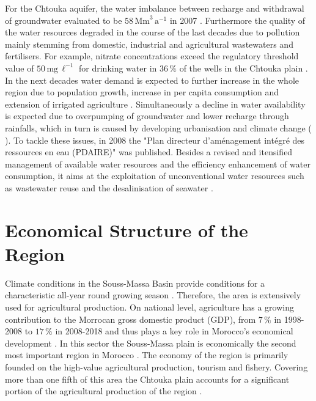For the Chtouka aquifer, the water imbalance between recharge and withdrawal of groundwater evaluated to be $58 \, \textrm{Mm}^3 \, \textrm{a}^{-1}$ in 2007 \parencite{ABHSM-EauSout.2022}. 
Furthermore the quality of the water resources degraded in the course of the last decades due to pollution mainly stemming from domestic, industrial and agricultural wastewaters and fertilisers. 
For example, nitrate concentrations exceed the regulatory threshold value of $50 \, \textrm{mg} \, \ell^{-1}$ for drinking water in $36 \, \%$ of the wells in the Chtouka plain \parencite{Choukr.2017}. 
In the next decades water demand is expected to further increase in the whole region due to population growth, increase in per capita consumption and extension of irrigated agriculture \parencite{Choukr.2017}. 
Simultaneously a decline in water availability is expected due to overpumping of groundwater and lower recharge through rainfalls, which in turn is caused by developing urbanisation and climate change (\cite{Choukr.2017} \cite{Hssaisoune.2017}). 
To tackle these issues, in 2008 the "Plan directeur d'aménagement intégré des ressources en eau (PDAIRE)" was published. 
Besides a revised and itensified management of available water resources and the efficiency enhancement of water consumption, it aims at the exploitation of unconventional water resources such as wastewater reuse and the desalinisation of seawater \parencite{Choukr.2017}.

\section{Economical Structure of the Region}
\label{Sec-SouMaStructure}

Climate conditions in the Souss-Massa Basin provide conditions for a characteristic all-year round growing season \parencite{Hssaisoune.2017}. 
Therefore, the area is extensively used for agricultural production. 
On national level, agriculture has a growing contribution to the Morrocan gross domestic product (GDP), from $7 \, \%$ in 1998-2008 to $17 \, \%$ in 2008-2018 and thus plays a key role in Morocco's economical development \parencite{MarocVert.2021}. 
In this sector the Souss-Massa plain is economically the second most important region in Morocco \parencite{Choukr.2017}. 
The economy of the region is primarily founded on the high-value agricultural production, tourism and fishery. 
Covering more than one fifth of this area the Chtouka plain accounts for a significant portion of the agricultural production of the region \parencite{Choukr.2017}.

